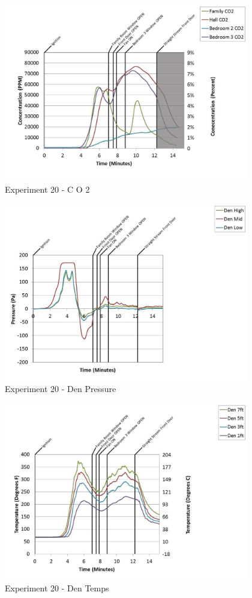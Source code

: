 \documentclass{article}
\begin{document}
\begin{appendices}
	\clearpage

	\begin{figure}[h!]
		\centering
		\includegraphics[height=3.05in]{0_Images/Results_Charts/Exp_20_Charts/CO2.pdf}
		\caption{Experiment 20 - C O 2}
	\end{figure}
 

	\begin{figure}[h!]
		\centering
		\includegraphics[height=3.05in]{0_Images/Results_Charts/Exp_20_Charts/DenPressure.pdf}
		\caption{Experiment 20 - Den Pressure}
	\end{figure}
 
	\clearpage

	\begin{figure}[h!]
		\centering
		\includegraphics[height=3.05in]{0_Images/Results_Charts/Exp_20_Charts/DenTemps.pdf}
		\caption{Experiment 20 - Den Temps}
	\end{figure}
 


\end{appendices}
\end{document}
